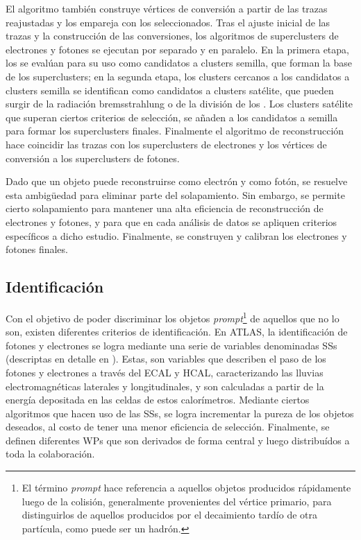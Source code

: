 El algoritmo también construye vértices de conversión a partir de las trazas reajustadas y los empareja con los \topos seleccionados.
Tras el ajuste inicial de las trazas y la construcción de las conversiones, los algoritmos de superclusters de electrones y fotones se ejecutan por separado y en paralelo. En la primera etapa, los \topos se evalúan para su uso como candidatos a clusters semilla, que forman la base de los superclusters; en la segunda etapa, los clusters cercanos a los candidatos a clusters semilla se identifican como candidatos a clusters satélite, que pueden surgir de la radiación bremsstrahlung o de la división de los \topos. Los clusters satélite que superan ciertos criterios de selecci\'on, se añaden a los candidatos a semilla para formar los superclusters finales.
Finalmente el algoritmo de reconstrucción hace coincidir las trazas con los superclusters de electrones y los vértices de conversión a los superclusters de fotones.

Dado que un objeto puede reconstruirse como electrón y como fotón, se resuelve esta ambigüedad para eliminar parte del solapamiento. Sin embargo, se permite cierto solapamiento para mantener una alta eficiencia de reconstrucción de electrones y fotones, y para que en cada an\'alisis de datos se apliquen criterios espec\'ificos a dicho estudio. Finalmente, se construyen y calibran los electrones y fotones finales.



\subsection{Identificaci\'on}
\label{subsec:objects:egamma:id}

Con el objetivo de poder discriminar los objetos \textit{prompt}\footnote{El término \textit{prompt} hace referencia a aquellos objetos producidos rápidamente luego de la colisión, generalmente provenientes del vértice primario, para distinguirlos de aquellos producidos por el decaimiento tardío de otra partícula, como puede ser un hadrón.} de aquellos que no lo son, existen diferentes criterios de identificaci\'on.
En \ac{ATLAS}, la identificaci\'on de fotones y electrones se logra mediante una serie de variables denominadas \acfp{SS} (descriptas en detalle en \Ch{\ref{ch:pid_ss}}). Estas, son variables que describen el paso de los fotones y electrones a trav\'es del \ac{ECAL} y \ac{HCAL}, caracterizando las lluvias electromagnéticas laterales y longitudinales, y son calculadas a partir de la energ\'ia depositada en las celdas de estos calor\'imetros. Mediante ciertos algoritmos que hacen uso de las \acp{SS}, se logra incrementar la pureza de los objetos deseados, al costo de tener una menor eficiencia de selecci\'on.
Finalmente, se definen diferentes \acp{WP} que son derivados de forma central y luego distribu\'idos a toda la colaboraci\'on.

